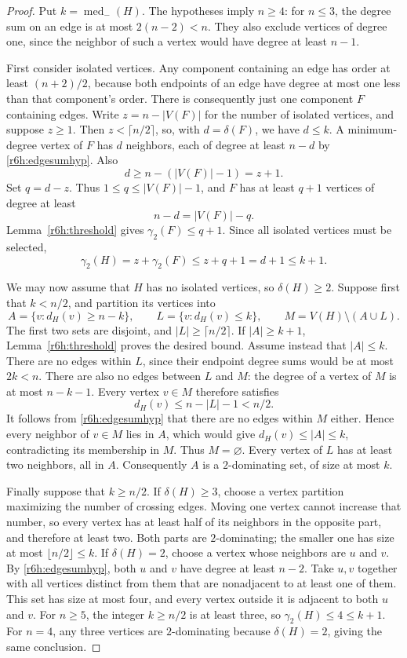 \documentclass[11pt,a4paper]{article}
\theoremstyle{remark}
\begin{document}
\begin{proof}
Put $k=\operatorname{med}_{-}(H)$.
The hypotheses imply $n\ge4$: for $n\le3$, the degree sum on an
edge is at most $2(n-2)<n$.
They also exclude vertices of degree one, since the neighbor of such
a vertex would have degree at least $n-1$.

First consider isolated vertices.
Any component containing an edge has order at least $(n+2)/2$,
because both endpoints of an edge have degree at most one less than
that component's order.
There is consequently just one component $F$ containing edges.
Write $z=n-|V(F)|$ for the number of isolated vertices, and suppose
$z\ge1$.
Then $z<\lceil n/2\rceil$, so, with $d=\delta(F)$, we have $d\le k$.
A minimum-degree vertex of $F$ has $d$ neighbors, each of degree at
least $n-d$ by \eqref{r6h:edgesumhyp}.
Also
\[
 d\ge n-(|V(F)|-1)=z+1.
\]
Set $q=d-z$.  Thus $1\le q\le |V(F)|-1$, and $F$ has at least
$q+1$ vertices of degree at least
\[
 n-d=|V(F)|-q.
\]
Lemma~\ref{r6h:threshold} gives $\gamma_2(F)\le q+1$.
Since all isolated vertices must be selected,
\[
 \gamma_2(H)=z+\gamma_2(F)\le z+q+1=d+1\le k+1.
\]

We may now assume that $H$ has no isolated vertices, so
$\delta(H)\ge2$.
Suppose first that $k<n/2$, and partition its vertices into
\[
 A=\{v:d_H(v)\ge n-k\},\qquad
 L=\{v:d_H(v)\le k\},\qquad
 M=V(H)\setminus(A\cup L).
\]
The first two sets are disjoint, and
$|L|\ge\lceil n/2\rceil$.
If $|A|\ge k+1$, Lemma~\ref{r6h:threshold} proves the desired bound.
Assume instead that $|A|\le k$.
There are no edges within $L$, since their endpoint degree sums
would be at most $2k<n$.
There are also no edges between $L$ and $M$: the degree of a vertex
of $M$ is at most $n-k-1$.
Every vertex $v\in M$ therefore satisfies
\[
 d_H(v)\le n-|L|-1<n/2.
\]
It follows from \eqref{r6h:edgesumhyp} that there are no edges within
$M$ either.
Hence every neighbor of $v\in M$ lies in $A$, which would give
$d_H(v)\le|A|\le k$, contradicting its membership in $M$.
Thus $M=\varnothing$.
Every vertex of $L$ has at least two neighbors, all in $A$.
Consequently $A$ is a $2$-dominating set, of size at most $k$.

Finally suppose that $k\ge n/2$.
If $\delta(H)\ge3$, choose a vertex partition maximizing the number
of crossing edges.
Moving one vertex cannot increase that number, so every vertex has
at least half of its neighbors in the opposite part, and therefore
at least two.
Both parts are $2$-dominating; the smaller one has size at most
$\lfloor n/2\rfloor\le k$.
If $\delta(H)=2$, choose a vertex whose neighbors are $u$ and $v$.
By \eqref{r6h:edgesumhyp}, both $u$ and $v$ have degree at least
$n-2$.
Take $u,v$ together with all vertices distinct from them that are
nonadjacent to at least one of them.
This set has size at most four, and every vertex outside it is
adjacent to both $u$ and $v$.
For $n\ge5$, the integer $k\ge n/2$ is at least three, so
$\gamma_2(H)\le4\le k+1$.
For $n=4$, any three vertices are $2$-dominating because
$\delta(H)=2$, giving the same conclusion.
\end{proof}
\end{document}
